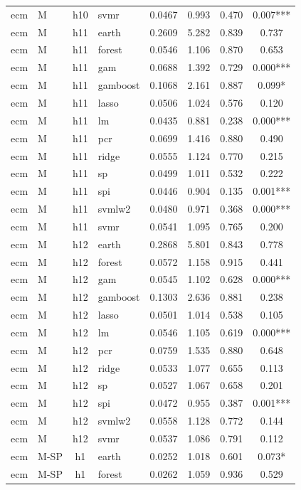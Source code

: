 \begin{ThreePartTable}
\begin{longtable}[t]{llclcccc}
ecm & M & h10 & svmr & 0.0467 & 0.993 & 0.470 & 0.007***\\
\addlinespace
ecm & M & h11 & earth & 0.2609 & 5.282 & 0.839 & 0.737\\
ecm & M & h11 & forest & 0.0546 & 1.106 & 0.870 & 0.653\\
ecm & M & h11 & gam & 0.0688 & 1.392 & 0.729 & 0.000***\\
ecm & M & h11 & gamboost & 0.1068 & 2.161 & 0.887 & 0.099*\\
ecm & M & h11 & lasso & 0.0506 & 1.024 & 0.576 & 0.120\\
ecm & M & h11 & lm & 0.0435 & 0.881 & 0.238 & 0.000***\\
ecm & M & h11 & pcr & 0.0699 & 1.416 & 0.880 & 0.490\\
ecm & M & h11 & ridge & 0.0555 & 1.124 & 0.770 & 0.215\\
ecm & M & h11 & sp & 0.0499 & 1.011 & 0.532 & 0.222\\
ecm & M & h11 & spi & 0.0446 & 0.904 & 0.135 & 0.001***\\
ecm & M & h11 & svmlw2 & 0.0480 & 0.971 & 0.368 & 0.000***\\
ecm & M & h11 & svmr & 0.0541 & 1.095 & 0.765 & 0.200\\
\addlinespace
ecm & M & h12 & earth & 0.2868 & 5.801 & 0.843 & 0.778\\
ecm & M & h12 & forest & 0.0572 & 1.158 & 0.915 & 0.441\\
ecm & M & h12 & gam & 0.0545 & 1.102 & 0.628 & 0.000***\\
ecm & M & h12 & gamboost & 0.1303 & 2.636 & 0.881 & 0.238\\
ecm & M & h12 & lasso & 0.0501 & 1.014 & 0.538 & 0.105\\
ecm & M & h12 & lm & 0.0546 & 1.105 & 0.619 & 0.000***\\
ecm & M & h12 & pcr & 0.0759 & 1.535 & 0.880 & 0.648\\
ecm & M & h12 & ridge & 0.0533 & 1.077 & 0.655 & 0.113\\
ecm & M & h12 & sp & 0.0527 & 1.067 & 0.658 & 0.201\\
ecm & M & h12 & spi & 0.0472 & 0.955 & 0.387 & 0.001***\\
ecm & M & h12 & svmlw2 & 0.0558 & 1.128 & 0.772 & 0.144\\
ecm & M & h12 & svmr & 0.0537 & 1.086 & 0.791 & 0.112\\
\addlinespace
ecm & M-SP & h1 & earth & 0.0252 & 1.018 & 0.601 & 0.073*\\
ecm & M-SP & h1 & forest & 0.0262 & 1.059 & 0.936 & 0.529\\

\end{longtable}
\end{ThreePartTable}
